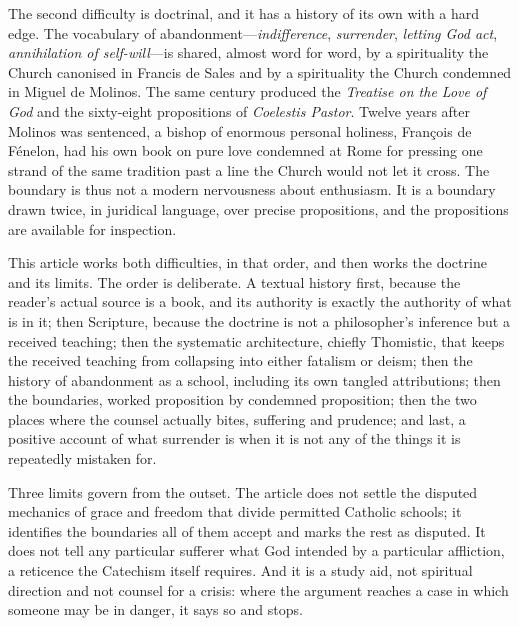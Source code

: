 The second difficulty is doctrinal, and it has a history of its own with a hard edge. The vocabulary of abandonment---\emph{indifference}, \emph{surrender}, \emph{letting God act}, \emph{annihilation of self-will}---is shared, almost word for word, by a spirituality the Church canonised in Francis de Sales and by a spirituality the Church condemned in Miguel de Molinos. The same century produced the \emph{Treatise on the Love of God} and the sixty-eight propositions of \emph{Coelestis Pastor}. Twelve years after Molinos was sentenced, a bishop of enormous personal holiness, François de Fénelon, had his own book on pure love condemned at Rome for pressing one strand of the same tradition past a line the Church would not let it cross. The boundary is thus not a modern nervousness about enthusiasm. It is a boundary drawn twice, in juridical language, over precise propositions, and the propositions are available for inspection.

This article works both difficulties, in that order, and then works the doctrine and its limits. The order is deliberate. A textual history first, because the reader's actual source is a book, and its authority is exactly the authority of what is in it; then Scripture, because the doctrine is not a philosopher's inference but a received teaching; then the systematic architecture, chiefly Thomistic, that keeps the received teaching from collapsing into either fatalism or deism; then the history of abandonment as a school, including its own tangled attributions; then the boundaries, worked proposition by condemned proposition; then the two places where the counsel actually bites, suffering and prudence; and last, a positive account of what surrender is when it is not any of the things it is repeatedly mistaken for.

Three limits govern from the outset. The article does not settle the disputed mechanics of grace and freedom that divide permitted Catholic schools; it identifies the boundaries all of them accept and marks the rest as disputed. It does not tell any particular sufferer what God intended by a particular affliction, a reticence the Catechism itself requires. And it is a study aid, not spiritual direction and not counsel for a crisis: where the argument reaches a case in which someone may be in danger, it says so and stops.
